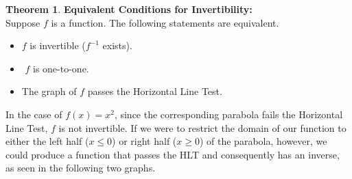 \documentclass[11pt]{book}
\theoremstyle{definition}  %
\newtheorem{thm}{Theorem}[chapter] %
\newcommand{\bbm}{\begin{boxedminipage}{4.80in}} %
\newcommand{\ebm}{\end{boxedminipage}}
\begin{document}
\colorbox{ResultColor}{\bbm

\begin{thm}  \textbf{Equivalent Conditions for Invertibility:}\\
Suppose $f$ is a function. The following statements are equivalent.
\begin{itemize}
\item $f$ is invertible ($f^{-1}$ exists).
\item $f$ is one-to-one.
\item The graph of $f$ passes the Horizontal Line Test.
\end{itemize}

\end{thm}

\ebm}

\smallskip
\newpage

In the case of $f(x)=x^2$, since the corresponding parabola fails the Horizontal Line Test, $f$ is not invertible.  If we were to restrict the domain of our function to either the left half ($x\leq 0$) or right half ($x\geq 0$) of the parabola, however, we could produce a function that passes the HLT and consequently has an inverse, as seen in the following two graphs. 
\end{document}
